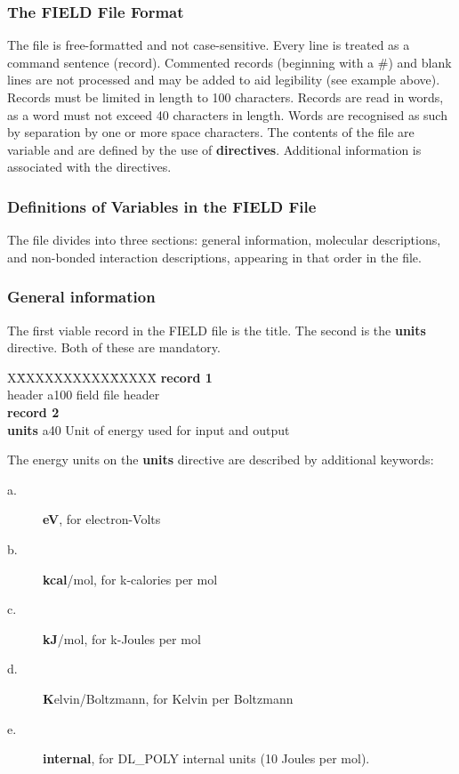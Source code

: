 \subsubsection{The FIELD File Format}

The file is free-formatted and not case-sensitive. Every line is
treated as a command sentence (record).  Commented records
(beginning with a \#) and blank lines are not processed and may be
added to aid legibility (see example above).  Records must be
limited in length to 100 characters.  Records are read in words,
as a word must not exceed 40 characters in length.  Words are
recognised as such by separation by one or more space characters.
The contents of the file are variable and are defined by the use
of {\bf directives}.  Additional information is associated with
the directives.

\subsubsection{Definitions of Variables in the FIELD File}

The file divides into three sections: general information, molecular
descriptions, and non-bonded interaction descriptions, appearing in that
order in the file.

\subsubsection*{General information}

The first viable record in the FIELD file is the title.  The
second is the {\bf units} directive.  Both of these are mandatory.
\begin{tabbing}
X\=XXXXXXXXXX\=XXXXX\=\kill
{\bf record 1} \\
\> header      \> a100 \> field file header \\
{\bf record 2}\\
\> {\bf units} \> a40  \> Unit of energy used for input and output
\end{tabbing}
\noindent The energy units on the {\bf units} directive are
described by additional keywords:
\begin{description}
\item[a.] {\bf eV}, for electron-Volts
\item[b.] {\bf kcal}/mol, for k-calories per mol
\item[c.] {\bf kJ}/mol, for k-Joules per mol
\item[d.] {\bf K}elvin/Boltzmann, for Kelvin per Boltzmann
\item[e.] {\bf internal}, for DL\_POLY internal units (10 Joules per mol).
\end{description}

